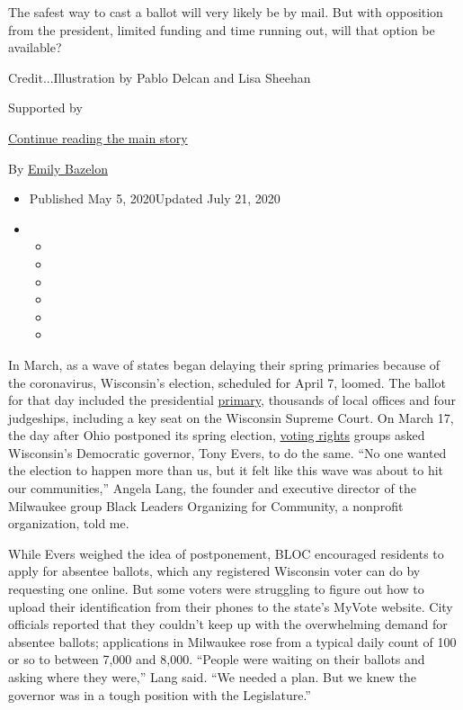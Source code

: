 The safest way to cast a ballot will very likely be by mail. But with
opposition from the president, limited funding and time running out,
will that option be available?

Credit...Illustration by Pablo Delcan and Lisa Sheehan

Supported by

\protect\hyperlink{after-sponsor}{Continue reading the main story}

By \href{https://www.nytimes3xbfgragh.onion/by/emily-bazelon}{Emily
Bazelon}

\begin{itemize}
\item
  Published May 5, 2020Updated July 21, 2020
\item
  \begin{itemize}
  \item
  \item
  \item
  \item
  \item
  \item
  \end{itemize}
\end{itemize}

In March, as a wave of states began delaying their spring primaries
because of the coronavirus, Wisconsin's election, scheduled for April 7,
loomed. The ballot for that day included the presidential
\href{https://www.nytimes3xbfgragh.onion/2020/06/09/us/politics/atlanta-voting-georgia-primary.html}{primary},
thousands of local offices and four judgeships, including a key seat on
the Wisconsin Supreme Court. On March 17, the day after Ohio postponed
its spring election,
\href{https://www.nytimes3xbfgragh.onion/2020/07/21/us/john-lewis-voting-rights-act.html}{voting
rights} groups asked Wisconsin's Democratic governor, Tony Evers, to do
the same. ``No one wanted the election to happen more than us, but it
felt like this wave was about to hit our communities,'' Angela Lang, the
founder and executive director of the Milwaukee group Black Leaders
Organizing for Community, a nonprofit organization, told me.

While Evers weighed the idea of postponement, BLOC encouraged residents
to apply for absentee ballots, which any registered Wisconsin voter can
do by requesting one online. But some voters were struggling to figure
out how to upload their identification from their phones to the state's
MyVote website. City officials reported that they couldn't keep up with
the overwhelming demand for absentee ballots; applications in Milwaukee
rose from a typical daily count of 100 or so to between 7,000 and 8,000.
``People were waiting on their ballots and asking where they were,''
Lang said. ``We needed a plan. But we knew the governor was in a tough
position with the Legislature.''

